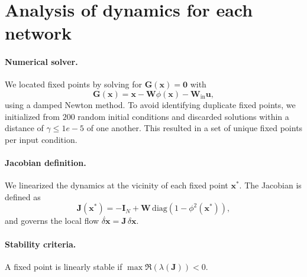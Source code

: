 \documentclass[mlabstract]{jmlr}
\begin{document}
\section{Analysis of dynamics for each network}\label{apd:first}

\paragraph{Numerical solver.}
We located fixed points by solving for $\textbf{G}(\textbf{x})=\textbf{0}$ with
\[
\textbf{G}(\textbf{x}) = \textbf{x} - \mathbf{W} \phi(\textbf{x}) - \mathbf{W}_{\text{in}} \mathbf{u},
\]
using a damped Newton method. To avoid identifying duplicate fixed points, 
we initialized from $200$ random initial conditions and discarded solutions 
within a distance of  $\gamma \le 1e-5$ of one another. This resulted in a set of 
unique fixed points per input condition. %

\paragraph{Jacobian definition.}
We linearized the dynamics at the vicinity of each fixed point $\mathbf{x}^\ast$.  
The Jacobian is defined as
\begin{equation}
    \mathbf{J}(\textbf{x}^\ast) = -\mathbf{I}_N + \mathbf{W} \, \mathrm{diag}\!\left(1 - \phi^2(\textbf{x}^\ast)\right),
    \label{eq:Jct}
\end{equation}
and governs the local flow $\dot {\delta \textbf{x}} = \mathbf{J} \, \delta \textbf{x}$. 

\paragraph{Stability criteria.}
A fixed point is linearly stable if 
$\max \Re(\lambda(\mathbf{J})) < 0$. 
\end{document}
